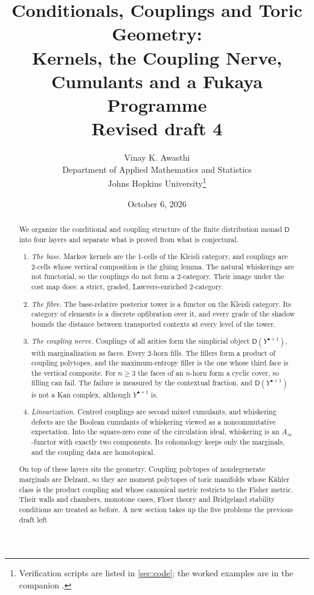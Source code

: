 \documentclass[11pt]{article}
\title{Conditionals, Couplings and Toric Geometry:\\
Kernels, the Coupling Nerve, Cumulants and a Fukaya Programme\\[4pt]
\large Revised draft 4}
\author{Vinay K. Awasthi\\
Department of Applied Mathematics and Statistics\\
Johns Hopkins University\thanks{Verification scripts are listed in \cref{sec:code}; the worked examples are
in the companion \cite{Awasthi-Family}.}}
\date{October 6, 2026}
\theoremstyle{definition}
\theoremstyle{remark}
\newcommand{\D}{\mathsf{D}}
\begin{document}
\maketitle

\begin{abstract}
We organize the conditional and coupling structure of the finite distribution monad $\D$ into four layers
and separate what is proved from what is conjectural.
\begin{enumerate}[label=(\arabic*),leftmargin=*]
\item \emph{The base.} Markov kernels are the 1-cells of the Kleisli category, and couplings are 2-cells whose
  vertical composition is the gluing lemma. The natural whiskerings are not functorial, so the couplings do not
  form a 2-category. Their image under the cost map does: a strict, graded, Lawvere-enriched 2-category.
\item \emph{The fibre.} The base-relative posterior tower is a functor on the Kleisli category. Its category of
  elements is a discrete opfibration over it, and every grade of the shadow bounds the distance between
  transported contexts at every level of the tower.
\item \emph{The coupling nerve.} Couplings of all arities form the simplicial object $\D(Y^{\bullet+1})$, with
  marginalization as faces. Every 2-horn fills. The fillers form a product of coupling polytopes, and the
  maximum-entropy filler is the one whose third face is the vertical composite. For $n\ge3$ the faces of an
  $n$-horn form a cyclic cover, so filling can fail. The failure is measured by the contextual fraction, and
  $\D(Y^{\bullet+1})$ is not a Kan complex, although $Y^{\bullet+1}$ is.
\item \emph{Linearization.} Centred couplings are second mixed cumulants, and whiskering defects are the
  Boolean cumulants of whiskering viewed as a noncommutative expectation. Into the square-zero cone of the
  circulation ideal, whiskering is an $A_\infty$-functor with exactly two components. Its cohomology keeps
  only the marginals, and the coupling data are homotopical.
\end{enumerate}
On top of these layers sits the geometry. Coupling polytopes of nondegenerate marginals are Delzant, so they
are moment polytopes of toric manifolds whose Kähler class is the product coupling and whose canonical metric
restricts to the Fisher metric. Their walls and chambers, monotone cases, Floer theory and Bridgeland
stability conditions are treated as before. A new section takes up the five problems the previous draft left

\end{abstract}
\end{document}
